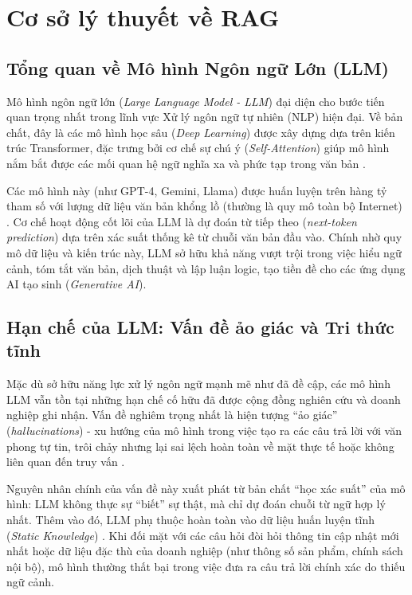 
\section{Cơ sở lý thuyết về RAG }
\label{sec:llm-limitations-rag}

\subsection{Tổng quan về Mô hình Ngôn ngữ Lớn (LLM)}
\label{subsec:llm_overview}

Mô hình ngôn ngữ lớn (\textit{Large Language Model - LLM}) đại diện cho bước tiến quan trọng nhất trong lĩnh vực Xử lý ngôn ngữ tự nhiên (NLP) hiện đại. Về bản chất, đây là các mô hình học sâu (\textit{Deep Learning}) được xây dựng dựa trên kiến trúc Transformer, đặc trưng bởi cơ chế sự chú ý (\textit{Self-Attention}) giúp mô hình nắm bắt được các mối quan hệ ngữ nghĩa xa và phức tạp trong văn bản \cite{vaswani2017attention}.

Các mô hình này (như GPT-4, Gemini, Llama) được huấn luyện trên hàng tỷ tham số với lượng dữ liệu văn bản khổng lồ (thường là quy mô toàn bộ Internet) \cite{team2024gemini}. Cơ chế hoạt động cốt lõi của LLM là dự đoán từ tiếp theo (\textit{next-token prediction}) dựa trên xác suất thống kê từ chuỗi văn bản đầu vào. Chính nhờ quy mô dữ liệu và kiến trúc này, LLM sở hữu khả năng vượt trội trong việc hiểu ngữ cảnh, tóm tắt văn bản, dịch thuật và lập luận logic, tạo tiền đề cho các ứng dụng AI tạo sinh (\textit{Generative AI}).

\subsection{Hạn chế của LLM: Vấn đề ảo giác và Tri thức tĩnh}
Mặc dù sở hữu năng lực xử lý ngôn ngữ mạnh mẽ như đã đề cập, các mô hình LLM vẫn tồn tại những hạn chế cố hữu đã được cộng đồng nghiên cứu và doanh nghiệp ghi nhận. Vấn đề nghiêm trọng nhất là hiện tượng ``ảo giác'' (\textit{hallucinations}) - xu hướng của mô hình trong việc tạo ra các câu trả lời với văn phong tự tin, trôi chảy nhưng lại sai lệch hoàn toàn về mặt thực tế hoặc không liên quan đến truy vấn \cite{ji2023survey}.

Nguyên nhân chính của vấn đề này xuất phát từ bản chất ``học xác suất'' của mô hình: LLM không thực sự ``biết'' sự thật, mà chỉ dự đoán chuỗi từ ngữ hợp lý nhất. Thêm vào đó, LLM phụ thuộc hoàn toàn vào dữ liệu huấn luyện tĩnh (\textit{Static Knowledge}) \cite{team2024gemini}. Khi đối mặt với các câu hỏi đòi hỏi thông tin cập nhật mới nhất hoặc dữ liệu đặc thù của doanh nghiệp (như thông số sản phẩm, chính sách nội bộ), mô hình thường thất bại trong việc đưa ra câu trả lời chính xác do thiếu ngữ cảnh.

